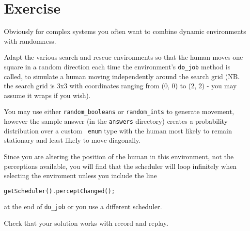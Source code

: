 \documentclass[a4]{article}
\begin{document}
\section{Exercise}

Obviously for complex systems you often want to combine dynamic environments with randomness.  

Adapt the various search and rescue environments so that the human moves one square in a random direction each time the environment's \texttt{do\_job} method is called, to simulate a human moving independently around the search grid (NB. the search grid is 3x3 with coordinates ranging from (0, 0) to (2, 2) - you may assume it wraps if you wish).  

You may use either \texttt{random\_booleans} or \texttt{random\_ints} to generate movement, however the sample answer (in the \texttt{answers} directory) creates a probability distribution over a custom \java\ \texttt{enum} type with the human most likely to remain stationary and least likely to move diagonally.

Since you are altering the position of the human in this environment, not the perceptions available, you will find that the scheduler will loop infinitely when selecting the enviroment unless you include the line
\begin{verbatim}
getScheduler().perceptChanged();
\end{verbatim}
at the end of \texttt{do\_job} or you use a different scheduler.

Check that your solution works with record and replay.
\end{document}
